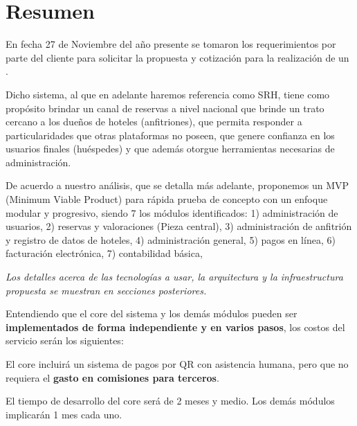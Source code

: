 \section{Resumen}

En fecha 27 de Noviembre del año presente se tomaron los requerimientos por parte del cliente para solicitar la propuesta y cotización para la realización de un . 

Dicho sistema, al que en adelante haremos referencia como SRH, tiene como propósito brindar un canal de reservas a nivel nacional que brinde un trato cercano a los dueños de hoteles (anfitriones), que permita responder a particularidades que otras plataformas no poseen, que genere confianza en los usuarios finales (huéspedes) y que además otorgue herramientas necesarias de administración.

De acuerdo a nuestro análisis, que se detalla más adelante, proponemos un MVP (Minimum Viable Product) para rápida prueba de concepto con un enfoque modular y progresivo, siendo 7 los módulos identificados:
1) administración de usuarios,
2) reservas y valoraciones (Pieza central),
3) administración de anfitrión y registro de datos de hoteles,
4) administración general,
5) pagos en línea,
6) facturación electrónica,
7) contabilidad básica,

\textit{Los detalles acerca de las tecnologías a usar, la arquitectura y la infraestructura propuesta se muestran en secciones posteriores.}

Entendiendo que el core del sistema y los demás módulos pueden ser \textbf{implementados de forma independiente y en varios pasos}, los costos del servicio serán los siguientes:

\begin{table}[h!]
    \centering
\end{table}

El core incluirá un sistema de pagos por QR con asistencia humana, pero que no requiera el \textbf{gasto en comisiones para terceros}.

El tiempo de desarrollo del core será de 2 meses y medio. Los demás módulos implicarán 1 mes cada uno.
